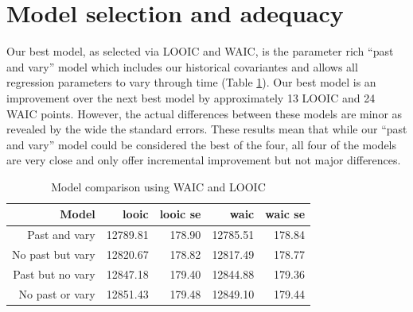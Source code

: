 \documentclass[12pt,letterpaper]{article}
\begin{document}
\section{Model selection and adequacy}

Our best model, as selected via LOOIC and WAIC, is the parameter rich ``past and vary'' model which includes our historical covariantes and allows all regression parameters to vary through time (Table \ref{tab:selection}). Our best model is an improvement over the next best model by approximately 13 LOOIC and 24 WAIC points. However, the actual differences between these models are minor as revealed by the wide the standard errors. These results mean that while our ``past and vary'' model could be considered the best of the four, all four of the models are very close and only offer incremental improvement but not major differences.
\begin{table}[ht]
  \centering
  \caption{Model comparison using WAIC and LOOIC}
  \begin{tabular}{ r r r r r }
    \hline
    Model & looic & looic se & waic & waic se \\
    \hline
    Past and vary & 12789.81 & 178.90 & 12785.51 & 178.84 \\
    No past but vary & 12820.67 & 178.82 & 12817.49 & 178.77 \\ 
    Past but no vary & 12847.18 & 179.40 & 12844.88 & 179.36 \\ 
    No past or vary & 12851.43 & 179.48 & 12849.10 & 179.44 \\ 
    \hline
  \end{tabular}
  \label{tab:selection}
\end{table}
\end{document}
